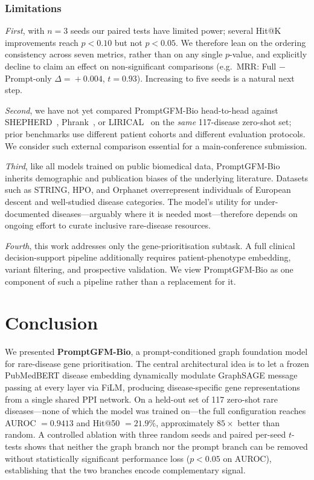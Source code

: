 \documentclass[conference]{IEEEtran}
\begin{document}
\subsubsection{Limitations}
\emph{First}, with $n\!=\!3$ seeds our paired tests have limited power; several Hit@K improvements reach $p\!<\!0.10$ but not $p\!<\!0.05$. We therefore lean on the ordering consistency across seven metrics, rather than on any single $p$-value, and explicitly decline to claim an effect on non-significant comparisons (e.g.\ MRR: Full $-$ Prompt-only $\Delta\!=\!+0.004$, $t\!=\!0.93$). Increasing to five seeds is a natural next step.

\emph{Second}, we have not yet compared PromptGFM-Bio head-to-head against SHEPHERD~\cite{shepherd2025}, Phrank~\cite{jagadeesh2019phrank}, or LIRICAL~\cite{robinson2020lirical} on the \emph{same} 117-disease zero-shot set; prior benchmarks use different patient cohorts and different evaluation protocols. We consider such external comparison essential for a main-conference submission.

\emph{Third}, like all models trained on public biomedical data, PromptGFM-Bio inherits demographic and publication biases of the underlying literature. Datasets such as STRING, HPO, and Orphanet overrepresent individuals of European descent and well-studied disease categories. The model's utility for under-documented diseases---arguably where it is needed most---therefore depends on ongoing effort to curate inclusive rare-disease resources.

\emph{Fourth}, this work addresses only the gene-prioritisation subtask. A full clinical decision-support pipeline additionally requires patient-phenotype embedding, variant filtering, and prospective validation. We view PromptGFM-Bio as one component of such a pipeline rather than a replacement for it.

\section{Conclusion}
\label{sec:conclusion}
We presented \textbf{PromptGFM-Bio}, a prompt-conditioned graph foundation model for rare-disease gene prioritisation. The central architectural idea is to let a frozen PubMedBERT disease embedding dynamically modulate GraphSAGE message passing at every layer via FiLM, producing disease-specific gene representations from a single shared PPI network. On a held-out set of 117 zero-shot rare diseases---none of which the model was trained on---the full configuration reaches AUROC $= 0.9413$ and Hit@50 $= 21.9\%$, approximately $85\times$ better than random. A controlled ablation with three random seeds and paired per-seed $t$-tests shows that neither the graph branch nor the prompt branch can be removed without statistically significant performance loss ($p<0.05$ on AUROC), establishing that the two branches encode complementary signal.
\end{document}
